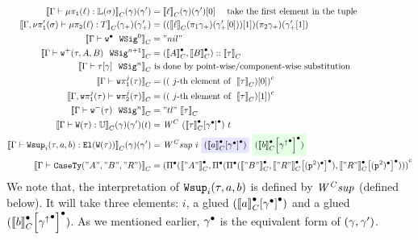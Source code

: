 \begin{align*}
%
%
  \denotesC{\goodTerm{\Gm}{\lkgproj{1}{\lkg}}{\TyLkg{\lsig}}}(\gm)(\gm') &= \denotesC{\ell}(\gm)(\gm')[0] \quad \text{ take the first element in the tuple} \\
  \denotesC{\goodTerm{\Gm, \lsigprojT{\lsig}}{\lkgproj{2}{\lkg}}{T}}(\gm_+)(\gm_+') &= ((\denotesC{\ell}(\pi_1{\gm_+})(\gm_+'[0]))[1])(\pi_2{\gm_+})(\gm_+'[1]) \\
  \denotesC{\goodWSig{\Gm}{\WSigEmp}{0}} &= "nil" \\
  \denotesC{\goodWSig{\Gm}{\WSigAdd{\wsig}{A}{B}}{n+1}} &= (\denotesCC{A} , \denotesCC{B}) :: \denotesC{\wsig}\\
  \denotesC{\goodWSig{\Gm}{\sub{\wsig}{\gm}}{n}} & \text{ is done by point-wise/component-wise substitution} \\
  \denotesC{\goodType{\Gm}{\wsigproj{j}{1}{\wsig}}{}} &= \Gmodel{(\text{ $j$-th element of }~\denotesC{\wsig})[0]}\\
  \denotesC{\goodType{\Gm, \wsigproj{j}{1}{\wsig}}{\wsigproj{j}{2}{\wsig}}{}} &= \Gmodel{(\text{ $j$-th element of }~\denotesC{\wsig})[1]}\\
  \denotesC{\goodWSig{\Gm}{\WSigSub{\wsig}}{n}} &= "tl"~\denotesC{\wsig}\\
  \denotesC{\goodTerm{\Gm}{\wcode{\wsig}}{\cU}}(\gm)(\gm')(t) &= \CWmodel~(\Gsub{\denotesCC{\wsig}}{\Glued{\gm}})~t \\
  \denotesC{\goodTerm{\Gm}{\Wsup{i}{\wsig}{a}{b}}{\El{\wcode{\wsig}}}}(\gm)(\gm') &= \CWsup~i~
  \colorbox{blue!10}{(\Gsub{\denotesCC{a}}{\Glued{\gm}})}~
  \colorbox{green!10}{(\Gsub{\denotesCC{b}}{{\Glued{\gm^\uparrow}}})} \\
  \denotesC{\goodType{\Gm}{\CaseSig{"A"}{"B"}{"R"}}{}} &= 
  \Gmodel{\GluedPi{\denotesCC{"A"}}{\GluedPi {\GluedPi{\denotesCC{"B"}}{\Gsub{\denotesCC{"R"}}{\GSubstWeak{2}}}} {\Gsub{\denotesCC{"R"}}{\GSubstWeak{2}}}}} \\
\end{align*}
We note that, the interpretation of $\texttt{Wsup}_{i}({\tau},{a},{b})$ is defined by $\mathit{W^Csup}$ (defined below). It will take three elements: $i$, a glued $({{\llbracket {a} \rrbracket}_C^\bullet}\!\left[{{\gamma}^\bullet}\right]^\bullet)$ and a glued $({{\llbracket {b} \rrbracket}_C^\bullet}\!\left[{{{\gamma^\uparrow}^\bullet}}\right]^\bullet)$.  As we mentioned earlier, ${\gamma}^\bullet$ is the equivalent form of $(\gamma, \gamma')$.

